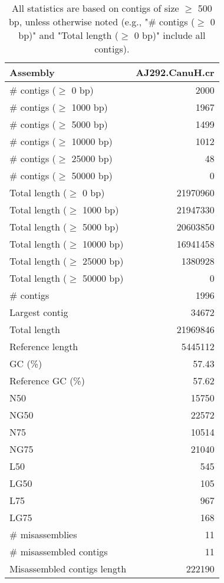 \documentclass[12pt,a4paper]{article}
\begin{document}
\begin{table}[ht]
\begin{center}
\caption{All statistics are based on contigs of size $\geq$ 500 bp, unless otherwise noted (e.g., "\# contigs ($\geq$ 0 bp)" and "Total length ($\geq$ 0 bp)" include all contigs).}
\begin{tabular}{|l*{1}{|r}|}
\hline
Assembly & AJ292.CanuH.cr \\ \hline
\# contigs ($\geq$ 0 bp) & 2000 \\ \hline
\# contigs ($\geq$ 1000 bp) & 1967 \\ \hline
\# contigs ($\geq$ 5000 bp) & 1499 \\ \hline
\# contigs ($\geq$ 10000 bp) & 1012 \\ \hline
\# contigs ($\geq$ 25000 bp) & 48 \\ \hline
\# contigs ($\geq$ 50000 bp) & 0 \\ \hline
Total length ($\geq$ 0 bp) & 21970960 \\ \hline
Total length ($\geq$ 1000 bp) & 21947330 \\ \hline
Total length ($\geq$ 5000 bp) & 20603850 \\ \hline
Total length ($\geq$ 10000 bp) & 16941458 \\ \hline
Total length ($\geq$ 25000 bp) & 1380928 \\ \hline
Total length ($\geq$ 50000 bp) & 0 \\ \hline
\# contigs & 1996 \\ \hline
Largest contig & 34672 \\ \hline
Total length & 21969846 \\ \hline
Reference length & 5445112 \\ \hline
GC (\%) & 57.43 \\ \hline
Reference GC (\%) & 57.62 \\ \hline
N50 & 15750 \\ \hline
NG50 & 22572 \\ \hline
N75 & 10514 \\ \hline
NG75 & 21040 \\ \hline
L50 & 545 \\ \hline
LG50 & 105 \\ \hline
L75 & 967 \\ \hline
LG75 & 168 \\ \hline
\# misassemblies & 11 \\ \hline
\# misassembled contigs & 11 \\ \hline
Misassembled contigs length & 222190 \\ \hline

\end{tabular}
\end{center}
\end{table}
\end{document}
